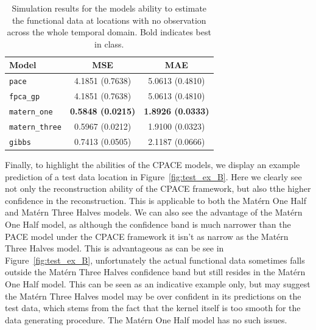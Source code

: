 \begin{table}
	\caption[Simulation results for Scenario B on test data]{Simulation results for the models ability to estimate the functional data at locations with no observation across the whole temporal domain. Bold indicates best in class.}
	\centering
	\label{tab:test_B}
	\begin{tabular}{lcc}
		\toprule
		\textbf{Model} & \textbf{MSE} & \textbf{MAE} \\
		\midrule
		\verb*|pace| & 4.1851 (0.7638) & 5.0613	(0.4810) \\
		\verb*|fpca_gp| & 4.1851 (0.7638) & 5.0613 (0.4810) \\
		\verb*|matern_one| & \textbf{0.5848	(0.0215)} & \textbf{1.8926	(0.0333)} \\
		\verb*|matern_three| & 0.5967 (0.0212) & 1.9100	(0.0323) \\
		\verb*|gibbs| & 0.7413 (0.0505) & 2.1187 (0.0666)\\
		\bottomrule
	\end{tabular}
\end{table}

Finally, to highlight the abilities of the CPACE models, we display an example prediction of a test data location in Figure~\ref{fig:test_ex_B}.
Here we clearly see not only the reconstruction ability of the CPACE framework, but also tthe higher confidence in the reconstruction.
This is applicable to both the Mat\'ern One Half and Mat\'ern Three Halves models.
We can also see the advantage of the Mat\'ern One Half model, as although the confidence band is much narrower than the PACE model under the CPACE framework it isn't as narrow as the Mat\'ern Three Halves model.
This is advantageous as can be see in Figure~\ref{fig:test_ex_B}, unfortunately the actual functional data sometimes falls outside the Mat\'ern Three Halves confidence band but still resides in the Mat\'ern One Half model.
This can be seen as an indicative example only, but may suggest the Mat\'ern Three Halves model may be over confident in its predictions on the test data, which stems from the fact that the kernel itself is too smooth for the data generating procedure. 
The Mat\'ern One Half model has no such issues.

